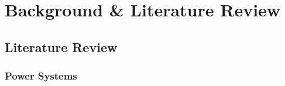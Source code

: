 
\section{Background \& Literature Review}



\subsection{Literature Review}



\subsubsection{Power Systems}

